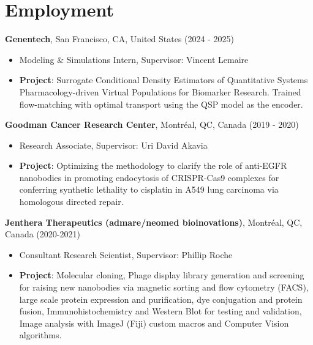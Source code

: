 \documentclass{article}
\newcommand{\cvsection}[1]{\section*{\rmfamily#1}}
\begin{document}
\cvsection{Employment}
\indent

\textbf{Genentech}, San Francisco, CA, United States \hfill (2024 - 2025)
\begin{itemize}
    \item[] Modeling \& Simulations Intern, Supervisor: Vincent Lemaire
    \item[] \textbf{Project}: Surrogate Conditional Density Estimators of Quantitative Systems Pharmacology-driven Virtual Populations for Biomarker Research. Trained flow-matching with optimal transport using the QSP model as the encoder.
\end{itemize}
\vspace{10pt}

\textbf{Goodman Cancer Research Center}, Montréal, QC, Canada \hfill (2019 - 2020)
\begin{itemize}
    \item[] Research Associate, Supervisor: Uri David Akavia
    \item[] \textbf{Project}: Optimizing the methodology to clarify the role of anti-EGFR nanobodies in promoting endocytosis of CRISPR-Cas9 complexes for conferring synthetic lethality to cisplatin in A549 lung carcinoma via homologous directed repair.
\end{itemize}
\vspace{10pt}

\textbf{Jenthera Therapeutics (admare/neomed bioinovations)}, Montréal, QC, Canada \hfill (2020-2021)
\begin{itemize}
    \item[] Consultant Research Scientist, Supervisor: Phillip Roche
    \item[] \textbf{Project}: Molecular cloning, Phage display library generation and screening for raising new nanobodies via magnetic sorting and flow cytometry (FACS), large scale protein expression and purification, dye conjugation and protein fusion, Immunohistochemistry and Western Blot for testing and validation, Image analysis with ImageJ (Fiji) custom macros and Computer Vision algorithms.
\end{itemize}
\end{document}
